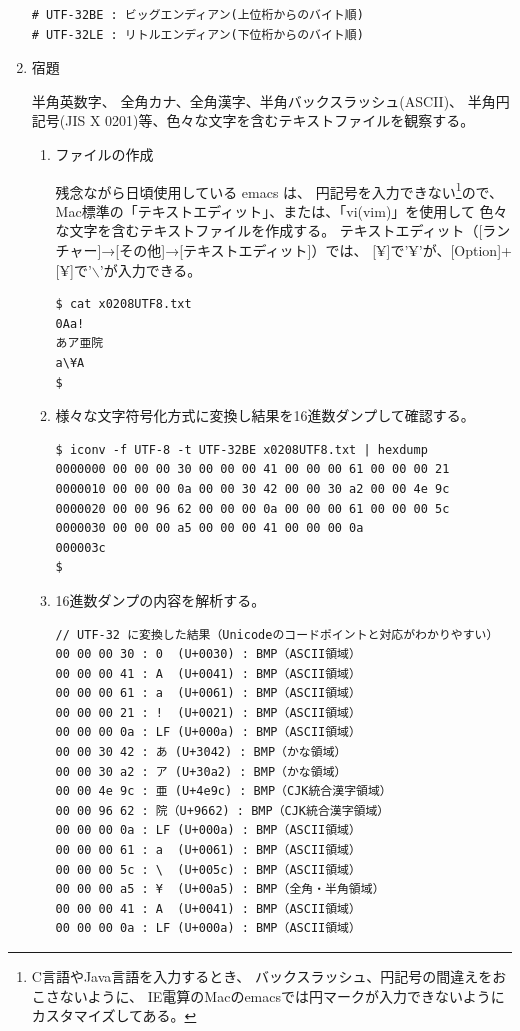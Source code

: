 \documentclass[a4j,dvipdfmx]{jarticle}
\begin{document}
\begin{enumerate}
\begin{lstlisting}[numbers=none]
# UTF-32BE : ビッグエンディアン(上位桁からのバイト順)
# UTF-32LE : リトルエンディアン(下位桁からのバイト順)
\end{lstlisting}

\newpage

\item 宿題

半角英数字、
全角カナ、全角漢字、半角バックスラッシュ(ASCII)、
半角円記号(JIS X 0201)等、色々な文字を含むテキストファイルを観察する。

\begin{enumerate}
\item ファイルの作成

残念ながら日頃使用している emacs は、
円記号を入力できない\footnote{
C言語やJava言語を入力するとき、
バックスラッシュ、円記号の間違えをおこさないように、
IE電算のMacのemacsでは円マークが入力できないようにカスタマイズしてある。
}ので、
Mac標準の「テキストエディット」、または、「vi(vim)」を使用して
色々な文字を含むテキストファイルを作成する。
テキストエディット（[ランチャー]→[その他]→[テキストエディット]）では、
[¥]で'¥'が、[Option]+[¥]で'$\backslash$'が入力できる。

\begin{lstlisting}[numbers=none]
$ cat x0208UTF8.txt
0Aa!
あア亜院
a\¥A
$
\end{lstlisting}

\item 様々な文字符号化方式に変換し結果を16進数ダンプして確認する。

\begin{lstlisting}[numbers=none]
$ iconv -f UTF-8 -t UTF-32BE x0208UTF8.txt | hexdump
0000000 00 00 00 30 00 00 00 41 00 00 00 61 00 00 00 21
0000010 00 00 00 0a 00 00 30 42 00 00 30 a2 00 00 4e 9c
0000020 00 00 96 62 00 00 00 0a 00 00 00 61 00 00 00 5c
0000030 00 00 00 a5 00 00 00 41 00 00 00 0a            
000003c
$
\end{lstlisting}

\item 16進数ダンプの内容を解析する。

\begin{lstlisting}[numbers=none]
// UTF-32 に変換した結果（Unicodeのコードポイントと対応がわかりやすい）
00 00 00 30 : 0  (U+0030) : BMP（ASCII領域）
00 00 00 41 : A  (U+0041) : BMP（ASCII領域）
00 00 00 61 : a  (U+0061) : BMP（ASCII領域）
00 00 00 21 : !  (U+0021) : BMP（ASCII領域）
00 00 00 0a : LF (U+000a) : BMP（ASCII領域）
00 00 30 42 : あ (U+3042) : BMP（かな領域）
00 00 30 a2 : ア (U+30a2) : BMP（かな領域）
00 00 4e 9c : 亜 (U+4e9c) : BMP（CJK統合漢字領域）
00 00 96 62 : 院（U+9662) : BMP（CJK統合漢字領域）
00 00 00 0a : LF (U+000a) : BMP（ASCII領域）
00 00 00 61 : a  (U+0061) : BMP（ASCII領域）
00 00 00 5c : \  (U+005c) : BMP（ASCII領域）
00 00 00 a5 : ¥  (U+00a5) : BMP（全角・半角領域）
00 00 00 41 : A  (U+0041) : BMP（ASCII領域）
00 00 00 0a : LF (U+000a) : BMP（ASCII領域）
\end{lstlisting}


\end{enumerate}
\end{enumerate}
\end{document}
